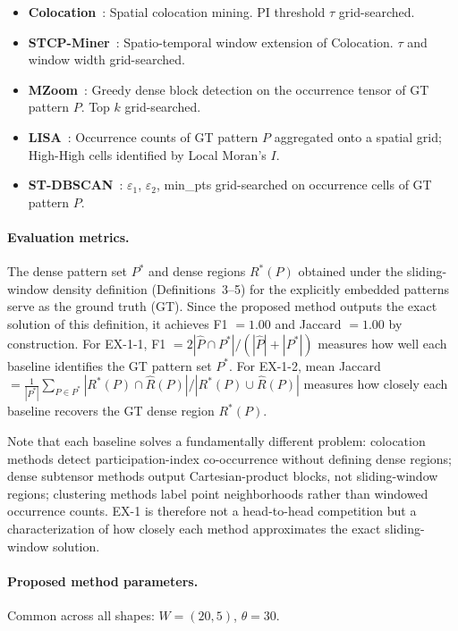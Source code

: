 \begin{itemize}
\item \textbf{Colocation}~\cite{shekhar2001colocation}: Spatial colocation mining. PI threshold $\tau$ grid-searched.
\item \textbf{STCP-Miner}~\cite{qian2009stcolocation}: Spatio-temporal window extension of Colocation. $\tau$ and window width grid-searched.
\item \textbf{MZoom}~\cite{shin2018mzoom}: Greedy dense block detection on the occurrence tensor of GT pattern $P$. Top $k$ grid-searched.
\item \textbf{LISA}~\cite{anselin1995lisa}: Occurrence counts of GT pattern $P$ aggregated onto a spatial grid; High-High cells identified by Local Moran's $I$.
\item \textbf{ST-DBSCAN}~\cite{birant2007stdbscan}: $\varepsilon_1$, $\varepsilon_2$, min\_pts grid-searched on occurrence cells of GT pattern $P$.
\end{itemize}

\paragraph{Evaluation metrics.}
The dense pattern set $P^*$ and dense regions $R^*(P)$
obtained under the sliding-window density definition (Definitions~3--5)
for the explicitly embedded patterns serve as the ground truth (GT).
Since the proposed method outputs the exact solution of this definition,
it achieves F1 $= 1.00$ and Jaccard $= 1.00$ by construction.
For EX-1-1,
F1 $= 2|\hat{P} \cap P^*| / (|\hat{P}| + |P^*|)$
measures how well each baseline identifies the GT pattern set $P^*$.
For EX-1-2, mean Jaccard
$= \frac{1}{|P^*|}\sum_{P \in P^*} |R^*(P) \cap \hat{R}(P)| / |R^*(P) \cup \hat{R}(P)|$
measures how closely each baseline recovers the GT dense region $R^*(P)$.

Note that each baseline solves a fundamentally different problem:
colocation methods detect participation-index co-occurrence without defining dense regions;
dense subtensor methods output Cartesian-product blocks, not sliding-window regions;
clustering methods label point neighborhoods rather than windowed occurrence counts.
EX-1 is therefore not a head-to-head competition but a characterization of
how closely each method approximates the exact sliding-window solution.

\paragraph{Proposed method parameters.}
Common across all shapes: $W = (20, 5)$, $\theta = 30$.

